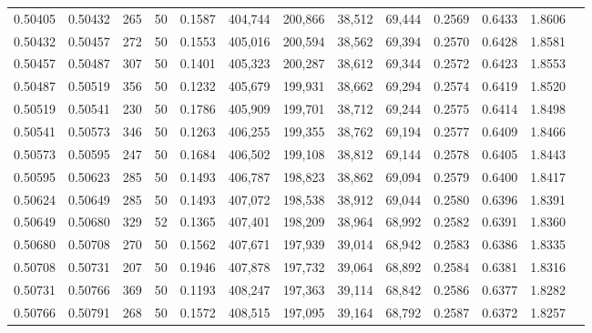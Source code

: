 \begin{tabular}{rrrrrrrrrrrrr}
0.50405 & 0.50432 &   265 &  50 &                                     0.1587 & 404,744 & 200,866 &  38,512 &  69,444 & 0.2569 & 0.6433 & 1.8606 \\
0.50432 & 0.50457 &   272 &  50 &                                     0.1553 & 405,016 & 200,594 &  38,562 &  69,394 & 0.2570 & 0.6428 & 1.8581 \\
0.50457 & 0.50487 &   307 &  50 &                                     0.1401 & 405,323 & 200,287 &  38,612 &  69,344 & 0.2572 & 0.6423 & 1.8553 \\
0.50487 & 0.50519 &   356 &  50 &                                     0.1232 & 405,679 & 199,931 &  38,662 &  69,294 & 0.2574 & 0.6419 & 1.8520 \\
0.50519 & 0.50541 &   230 &  50 &                                     0.1786 & 405,909 & 199,701 &  38,712 &  69,244 & 0.2575 & 0.6414 & 1.8498 \\
0.50541 & 0.50573 &   346 &  50 &                                     0.1263 & 406,255 & 199,355 &  38,762 &  69,194 & 0.2577 & 0.6409 & 1.8466 \\
0.50573 & 0.50595 &   247 &  50 &                                     0.1684 & 406,502 & 199,108 &  38,812 &  69,144 & 0.2578 & 0.6405 & 1.8443 \\
0.50595 & 0.50623 &   285 &  50 &                                     0.1493 & 406,787 & 198,823 &  38,862 &  69,094 & 0.2579 & 0.6400 & 1.8417 \\
0.50624 & 0.50649 &   285 &  50 &                                     0.1493 & 407,072 & 198,538 &  38,912 &  69,044 & 0.2580 & 0.6396 & 1.8391 \\
0.50649 & 0.50680 &   329 &  52 &                                     0.1365 & 407,401 & 198,209 &  38,964 &  68,992 & 0.2582 & 0.6391 & 1.8360 \\
0.50680 & 0.50708 &   270 &  50 &                                     0.1562 & 407,671 & 197,939 &  39,014 &  68,942 & 0.2583 & 0.6386 & 1.8335 \\
0.50708 & 0.50731 &   207 &  50 &                                     0.1946 & 407,878 & 197,732 &  39,064 &  68,892 & 0.2584 & 0.6381 & 1.8316 \\
0.50731 & 0.50766 &   369 &  50 &                                     0.1193 & 408,247 & 197,363 &  39,114 &  68,842 & 0.2586 & 0.6377 & 1.8282 \\
0.50766 & 0.50791 &   268 &  50 &                                     0.1572 & 408,515 & 197,095 &  39,164 &  68,792 & 0.2587 & 0.6372 & 1.8257 \\

\end{tabular}
